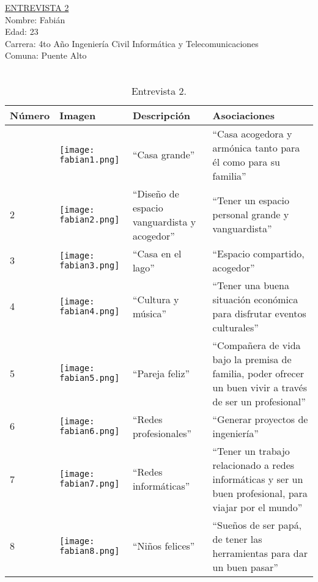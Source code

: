 \underline {ENTREVISTA 2} \\
Nombre: Fabián\\
Edad: 23\\
Carrera: 4to Año Ingeniería Civil Informática y Telecomunicaciones\\
Comuna: Puente Alto \\
\\
\begin{table}[H]
\centering
\begin{tabular}{>{\centering\arraybackslash}m{1cm} >{\centering\arraybackslash}m{2cm} >{\arraybackslash}m{5cm}>{\arraybackslash}m{5cm}}
\hline
Número  & Imagen & Descripción & Asociaciones \\
\hline \hline

1 & \texttt{[image: fabian1.png]} & ``Casa grande'' &  ``Casa acogedora y armónica tanto para él como para su familia''\\
\hline

2 & \texttt{[image: fabian2.png]} & ``Diseño de espacio vanguardista y acogedor'' & ``Tener un espacio personal grande y vanguardista'' \\
\hline

3 & \texttt{[image: fabian3.png]} & ``Casa en el lago'' & ``Espacio compartido, acogedor''\\
\hline

4 & \texttt{[image: fabian4.png]} & ``Cultura y música'' &  ``Tener una buena situación económica para disfrutar eventos culturales'' \\
\hline

5 & \texttt{[image: fabian5.png]} & ``Pareja feliz'' & ``Compañera de vida bajo la premisa de familia, poder ofrecer un buen vivir a través de ser un profesional'' \\
\hline

6 & \texttt{[image: fabian6.png]} & ``Redes profesionales'' & ``Generar proyectos de ingeniería''\\
\hline

7 & \texttt{[image: fabian7.png]} & ``Redes informáticas''  & ``Tener un trabajo relacionado a redes informáticas y ser un buen profesional, para viajar por el mundo'' \\
\hline

8 & \texttt{[image: fabian8.png]} & ``Niños felices'' & ``Sueños de ser papá, de tener las herramientas para dar un buen pasar'' \\
\hline

\end{tabular}
\caption{Entrevista 2.}
\label{tabla:fabian}
\end{table}



